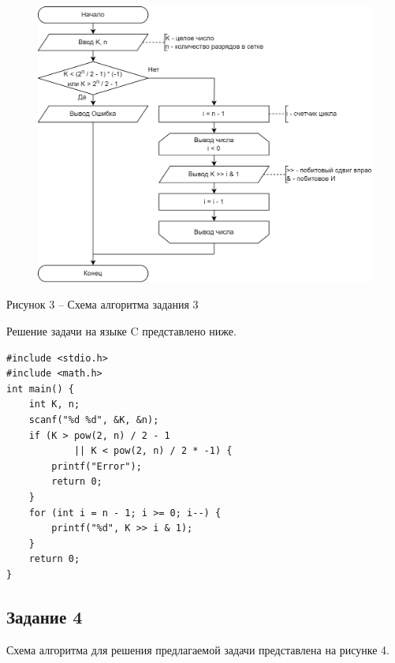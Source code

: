 \documentclass[a4paper,14pt]{extarticle}
\begin{document}
	\begin{figure}[h]
		\centering
		\includegraphics[width=0.8\linewidth]{schemes/s-3}
	\end{figure}
	\begin{center}
		Рисунок 3 – Схема алгоритма задания 3
	\end{center}
	
	Решение задачи на языке C представлено ниже.
	
	\begin{lstlisting}[tabsize=2,basicstyle=\ttfamily]
#include <stdio.h>
#include <math.h>
int main() {
	int K, n;
	scanf("%d %d", &K, &n);
	if (K > pow(2, n) / 2 - 1 
			|| K < pow(2, n) / 2 * -1) {
		printf("Error");
		return 0;
	}
	for (int i = n - 1; i >= 0; i--) {
		printf("%d", K >> i & 1);
	}
	return 0;
}
	\end{lstlisting}
	
	\subsection*{Задание 4}
	Схема алгоритма для решения предлагаемой задачи представлена на рисунке 4.
	
\end{document}
